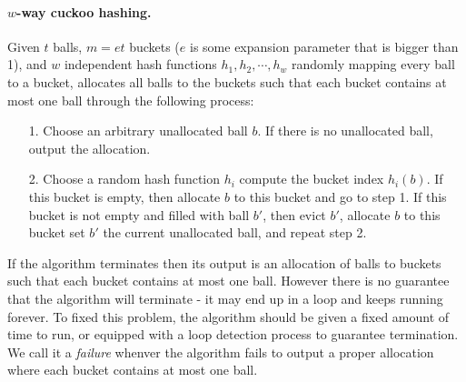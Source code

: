 \paragraph{$w$-way cuckoo hashing.}Given $t$ balls, $m=et$ buckets ($e$ is some expansion parameter that is bigger than 1), and $w$ independent hash functions $h_1, h_2,\cdots, h_w$ randomly mapping every ball to a bucket, allocates all balls to the buckets such that each bucket contains at most one ball through the following process: 
\begin{itemize}
  \item[1.] Choose an arbitrary unallocated ball $b$. If there is no unallocated ball, output the allocation. 
  \item[2.] Choose a random hash function $h_i$ compute the bucket index $h_i(b)$. If this bucket is empty, then allocate $b$ to this bucket and go to step 1. If this bucket is not empty and filled with ball $b'$, then evict $b'$, allocate $b$ to this bucket set $b'$ the current unallocated ball, and repeat step 2. 
\end{itemize}
If the algorithm terminates then its output is an allocation of balls to buckets such that each bucket contains at most one ball. However there is no guarantee that the algorithm will terminate - it may end up in a loop and keeps running forever. To fixed this problem, the algorithm should be given a fixed amount of time to run, or equipped with a loop detection process to guarantee termination. We call it a \emph{failure} whenver the algorithm fails to output a proper allocation where each bucket contains at most one ball. 


